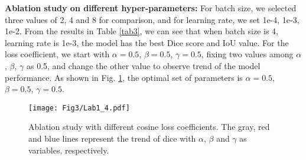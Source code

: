 \documentclass{article}
\begin{document}
\noindent\textbf{Ablation study on different hyper-parameters:} For batch size, we selected three values of 2, 4 and 8 for comparison, and for learning rate, we set 1e-4, 1e-3, 1e-2. From the results in Table \ref{tab3}, we can see that when batch size is 4, learning rate is 1e-3, the model has the best Dice score and IoU value. For the loss coefficient,  we start with $\alpha=0.5$, $\beta=0.5$, $\gamma=0.5$, fixing two values among $\alpha$ , $\beta$, $\gamma$ as 0.5, and change the other value to observe trend of the model performance. As shown in Fig. \ref{Analysiscoef}, the optimal set of parameters is $\alpha=0.5$, $\beta=0.5$, $\gamma=0.5$.
\vspace{-2mm}
\begin{figure}[!ht]
\setlength{\abovecaptionskip}{-10cm}
\setlength{\belowcaptionskip}{-15cm}
\centering \texttt{[image: Fig3/Lab1\_4.pdf]}
\caption{Ablation study with different cosine loss coefficients. The gray, red and blue lines represent the trend of dice with $\alpha$, $\beta$ and $\gamma$ as variables, respectively.}
\label{Analysiscoef}
\vspace{-6mm}
\end{figure}
\vspace{-3mm}
\begin{table}[!ht]
\centering
\caption{Ablation study on different hyper-parameters.}
\label{tab3}
\vspace{-8mm}
\end{table}
\end{document}
